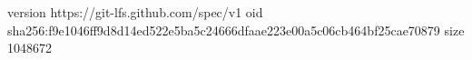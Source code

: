 version https://git-lfs.github.com/spec/v1
oid sha256:f9e1046ff9d8d14ed522e5ba5c24666dfaae223e00a5c06cb464bf25cae70879
size 1048672

